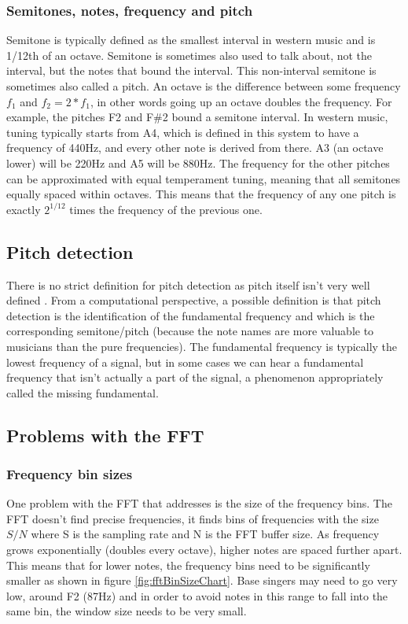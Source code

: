 \subsubsection{Semitones, notes, frequency and pitch}
Semitone is typically defined as the smallest interval in western music and is 1/12th of an octave. Semitone is sometimes also used to talk about, not the interval, but the notes that bound the interval. This non-interval semitone is sometimes also called a pitch.   
An octave is the difference between some frequency $f_1$ and $f_2 = 2*f_1$, in other words going up an octave doubles the frequency. For example, the pitches F2 and F\#2 bound a semitone interval. In western music, tuning typically starts from A4, which is defined in this system to have a frequency of 440Hz, and every other note is derived from there. A3 (an octave lower) will be 220Hz and A5 will be 880Hz. The frequency for the other pitches can be approximated with equal temperament tuning, meaning that all semitones equally spaced within octaves. This means that the frequency of any one pitch is exactly $2^{1/12}$ times the frequency of the previous one. 

\subsection{Pitch detection}
There is no strict definition for pitch detection as pitch itself isn't very well defined . From a computational perspective, a possible definition is that pitch detection is the identification of the fundamental frequency and which is the corresponding semitone/pitch (because the note names are more valuable to musicians than the pure frequencies). The fundamental frequency is typically the lowest frequency of a signal, but in some cases we can hear a fundamental frequency that isn't actually a part of the signal, a phenomenon appropriately called the missing fundamental. 
\subsection{Problems with the FFT}
\subsubsection{Frequency bin sizes}
One problem with the FFT that   addresses is the size of the frequency bins. The FFT doesn't find precise frequencies, it finds bins of frequencies with the size $S/N$ where S is the sampling rate and N is the FFT buffer size. As frequency grows exponentially (doubles every octave), higher notes are spaced further apart. This means that for lower notes, the frequency bins need to be significantly smaller as shown in figure \ref{fig:fftBinSizeChart}. Base singers may need to go very low, around F2 (87Hz) and in order to avoid notes in this range to fall into the same bin, the window size needs to be very small.  

